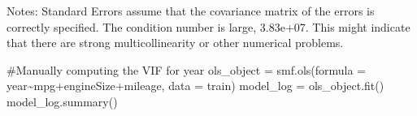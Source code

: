 \documentclass[
  letterpaper,
  DIV=11,
  numbers=noendperiod]{scrreprt}
\newenvironment{Shaded}{\begin{snugshade}}{\end{snugshade}}
\newcommand{\CommentTok}[1]{\textcolor[rgb]{0.37,0.37,0.37}{#1}}
\newcommand{\NormalTok}[1]{\textcolor[rgb]{0.00,0.23,0.31}{#1}}
\newcommand{\OperatorTok}[1]{\textcolor[rgb]{0.37,0.37,0.37}{#1}}
\newcommand{\StringTok}[1]{\textcolor[rgb]{0.13,0.47,0.30}{#1}}
\begin{document}
Notes: \newline
 [1] Standard Errors assume that the covariance matrix of the errors is correctly specified. \newline
 [2] The condition number is large, 3.83e+07. This might indicate that there are \newline
 strong multicollinearity or other numerical problems.

\begin{Shaded}
\begin{Highlighting}[]
\CommentTok{\#Manually computing the VIF for year}
\NormalTok{ols\_object }\OperatorTok{=}\NormalTok{ smf.ols(formula }\OperatorTok{=} \StringTok{\textquotesingle{}year\textasciitilde{}mpg+engineSize+mileage\textquotesingle{}}\NormalTok{, data }\OperatorTok{=}\NormalTok{ train)}
\NormalTok{model\_log }\OperatorTok{=}\NormalTok{ ols\_object.fit()}
\NormalTok{model\_log.summary()}
\end{Highlighting}
\end{Shaded}
\end{document}

